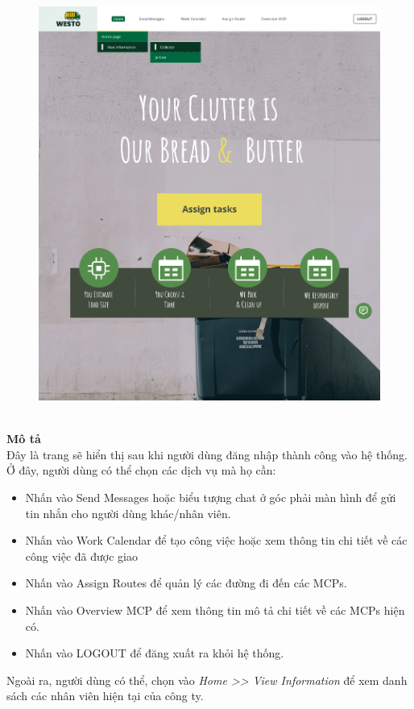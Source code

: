 \documentclass[a4paper]{article}
\begin{document}
\begin{enumerate}
\begin{figure}[!h]
        \includegraphics[width = 5in]{Image/home.png}
    \end{figure}\\
    \textbf{Mô tả}\\
    Đây là trang sẽ hiển thị sau khi người dùng đăng nhập thành công vào hệ thống. Ở đây, người dùng có thể chọn các dịch vụ mà họ cần:
    \begin{itemize}
        \item Nhấn vào Send Messages hoặc biểu tượng chat ở góc phải màn hình để gửi tin nhắn cho người dùng khác/nhân viên.
        \item Nhấn vào Work Calendar để tạo công việc hoặc xem thông tin chi tiết về các công việc đã được giao 
        \item Nhấn vào Assign Routes để quản lý các đường đi đến các MCPs.
        \item Nhấn vào Overview MCP để xem thông tin mô tả chi tiết về các MCPs hiện có.
        \item Nhấn vào LOGOUT để đăng xuất ra khỏi hệ thống.
    \end{itemize}
    Ngoài ra, người dùng có thể, chọn vào \textit{Home >> View Information} để xem danh sách các nhân viên hiện tại của công ty.
    \begin{figure}[!h]

\end{figure}
\end{enumerate}
\end{document}
